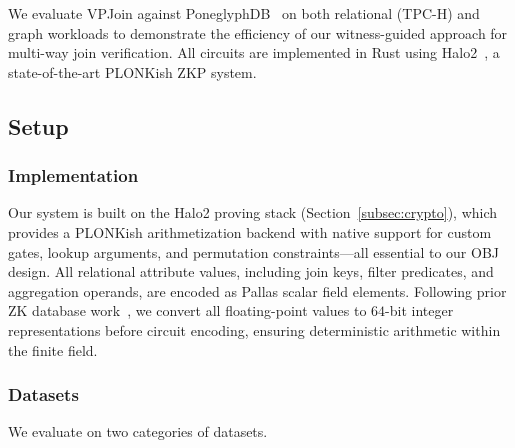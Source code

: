 \documentclass[sigconf]{acmart}
\begin{document}
We evaluate VPJoin against PoneglyphDB~\cite{gu2025poneglyphdb} on both relational (TPC-H) and graph workloads to demonstrate the efficiency of our witness-guided approach for multi-way join verification. All circuits are implemented in Rust using Halo2~\cite{halo2,halo2-protocol}, a state-of-the-art PLONKish ZKP system.

\begin{table}[t]
\captionsetup{skip=2pt}
\centering
\caption{Summary of properties for selected queries.}
\label{table:query_stat}
\renewcommand\arraystretch{1.0}
\vspace{-0.1in}
\end{table}

\subsection{Setup}

\subsubsection{Implementation}
Our system is built on the Halo2 proving stack (Section~\ref{subsec:crypto}), which provides a PLONKish arithmetization backend with native support for custom gates, lookup arguments, and permutation constraints---all essential to our OBJ design. All relational attribute values, including join keys, filter predicates, and aggregation operands, are encoded as Pallas scalar field elements. Following prior ZK database work~\cite{li2023zksql, gu2025poneglyphdb}, we convert all floating-point values to $64$-bit integer representations before circuit encoding, ensuring deterministic arithmetic within the finite field.

\subsubsection{Datasets}
We evaluate on two categories of datasets.
\end{document}
